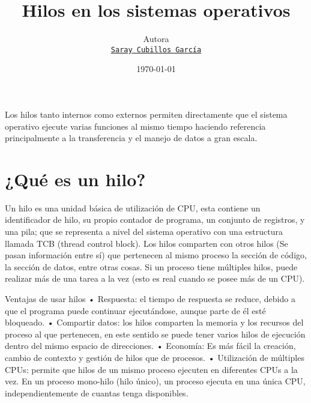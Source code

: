 \documentclass[11pt]{article}
\title{Hilos en los sistemas operativos}
\author{Autora\\%
    \href{mailto:saray.cubillos@udea.edu.co}{\texttt{Saray Cubillos García}} %
    }
\date{\today}
\begin{document}
{
\maketitle

Los hilos tanto internos como externos permiten directamente que el sistema operativo ejecute varias funciones al mismo tiempo  haciendo referencia principalmente a la transferencia y el manejo de datos a gran escala.

\noindent
\noindent

}



\section{¿Qué es un hilo?}
Un hilo es una unidad básica de utilización de CPU, esta contiene un identificador de hilo, su propio contador de programa, un conjunto de registros, y una pila; que se representa a nivel del sistema operativo con una estructura llamada TCB (thread control block). Los hilos comparten con otros hilos (Se pasan información entre sí) que pertenecen al mismo proceso la sección de código, la sección de datos, entre otras cosas. Si un proceso tiene múltiples hilos, puede realizar más de una tarea a la vez (esto es real cuando se posee más de un CPU).

Ventajas de usar hilos 
• Respuesta: el tiempo de respuesta se reduce, debido a que el programa puede continuar ejecutándose, aunque parte de él esté bloqueado. 
• Compartir datos: los hilos comparten la memoria y los recursos del proceso al que pertenecen, en este sentido se puede tener varios hilos de ejecución dentro del mismo espacio de direcciones. 
• Economía: Es más fácil la creación, cambio de contexto y gestión de hilos que de procesos. 
• Utilización de múltiples CPUs: permite que hilos de un mismo proceso ejecuten en diferentes CPUs a la vez. En un proceso mono-hilo (hilo único), un proceso ejecuta en una única CPU, independientemente de cuantas tenga disponibles. 
\end{document}
